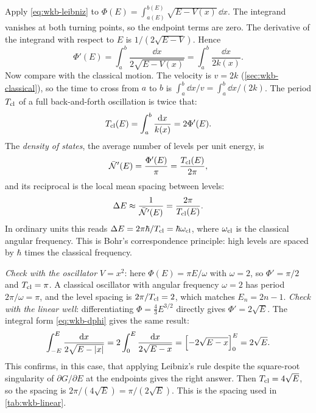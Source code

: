 Apply \cref{eq:wkb-leibniz} to $\Phi(E)=\int_{a(E)}^{b(E)}\sqrt{E-V(x)}\,\dd x$. The integrand vanishes at both turning points, so the endpoint terms are zero. The derivative of the integrand with respect to $E$ is $1/(2\sqrt{E-V})$. Hence
\begin{equation}
\Phi'(E)=\int_a^b\frac{\dd x}{2\sqrt{E-V(x)}}=\int_a^b\frac{\dd x}{2k(x)}.
\label{eq:wkb-dphi}
\end{equation}
Now compare with the classical motion. The velocity is $v=2k$ (\cref{sec:wkb-classical}), so the time to cross from $a$ to $b$ is $\int_a^b\dd x/v=\int_a^b\dd x/(2k)$. The period $T_{\rm cl}$ of a full back-and-forth oscillation is twice that:
\begin{equation}
T_{\rm cl}(E)=\int_a^b\frac{\mathrm{d} x}{k(x)}=2\Phi'(E).
\label{eq:wkb-period}
\end{equation}
The \emph{density of states}, the average number of levels per unit energy, is
\begin{equation}
\bar{\mathcal N}'(E)=\frac{\Phi'(E)}{\pi}=\frac{T_{\rm cl}(E)}{2\pi},
\label{eq:wkb-density}
\end{equation}
and its reciprocal is the local mean spacing between levels:
\begin{equation}
\Delta E\approx\frac{1}{\bar{\mathcal N}'(E)}=\frac{2\pi}{T_{\rm cl}(E)}.
\label{eq:wkb-spacing}
\end{equation}
In ordinary units this reads $\Delta E=2\pi\hbar/T_{\rm cl}=\hbar\omega_{\rm cl}$, where $\omega_{\rm cl}$ is the classical angular frequency. This is Bohr's correspondence principle: high levels are spaced by $\hbar$ times the classical frequency.

\emph{Check with the oscillator} $V=x^2$: here $\Phi(E)=\pi E/\omega$ with $\omega=2$, so $\Phi'=\pi/2$ and $T_{\rm cl}=\pi$. A classical oscillator with angular frequency $\omega=2$ has period $2\pi/\omega=\pi$, and the level spacing is $2\pi/T_{\rm cl}=2$, which matches $E_n=2n-1$. \emph{Check with the linear well}: differentiating $\Phi=\frac43E^{3/2}$ directly gives $\Phi'=2\sqrt E$. The integral form \cref{eq:wkb-dphi} gives the same result:
\[
\int_{-E}^{E}\frac{\mathrm{d} x}{2\sqrt{E-\left\lvert x\right\rvert}}=2\int_0^E\frac{\mathrm{d} x}{2\sqrt{E-x}}=\Bigl[-2\sqrt{E-x}\Bigr]_0^E=2\sqrt E .
\]
This confirms, in this case, that applying Leibniz's rule despite the square-root singularity of $\partial G/\partial E$ at the endpoints gives the right answer. Then $T_{\rm cl}=4\sqrt E$, so the spacing is $2\pi/(4\sqrt E)=\pi/(2\sqrt E)$. This is the spacing used in \cref{tab:wkb-linear}.


